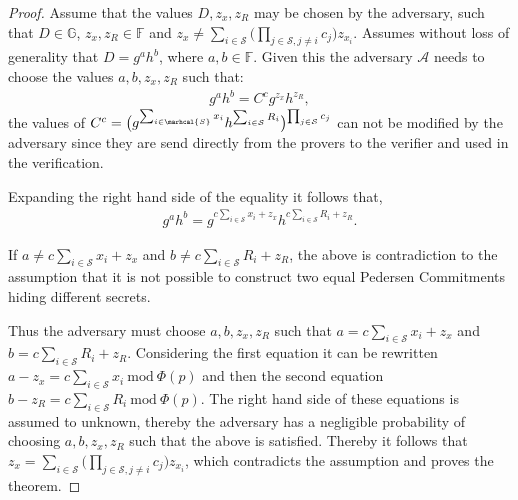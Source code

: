 \begin{proof}
Assume that the values $D,z_x,z_R$ may be chosen by the adversary, such that $D\in\mathds{G}$, $z_x,z_R\in\mathds{F}$ and  $z_x \neq \sum_{i\in\mathcal{S}} \Big( \prod_{j\in\mathcal{S}, j\neq i} c_j \big) z_{x_i}$. Assumes without loss of generality that  $D=g^ah^b$, where $a,b\in\mathds{F}$. Given this the adversary $\mathcal{A}$ needs to choose the values $a,b,z_x,z_R$ such that:
\begin{align*}
g^a h^b  = C^cg^{z_x}h^{z_R},
\end{align*}
the values of $C^c= \big(g^{\sum_{i\in\marhcal{S}}x_i}h^{\sum_{i\in\mathcal{S}} R_i} \big)^{\prod_{j\in\mathcal{S}}c_j} $ can not be modified by the adversary since they are send directly from the provers to the verifier and used in the verification.

Expanding the right hand side of the equality it follows that,
\begin{align*}
g^ah^b =  g^{c \sum_{i\in\mathcal{S}}x_i +z_x } h^{ c \sum_{i\in\mathcal{S}}R_i +z_R   }.
\end{align*}

If $a\neq c\sum_{i\in\mathcal{S}}x_i+z_x$ and $b\neq c\sum_{i\in\mathcal{S}}R_i +z_R$, the above is contradiction to the assumption that it is not possible to construct two equal Pedersen Commitments hiding different secrets. 

Thus the adversary must choose $a,b,z_x,z_R$ such that $a =  c\sum_{i\in\mathcal{S}}x_i+z_x$ and $b =  c\sum_{i\in\mathcal{S}}R_i +z_R$.  Considering the first equation it can be rewritten $a-z_x =  c \sum_{i\in\mathcal{S}} x_i \:\text{mod}\:\Phi(p)$ and then the second equation $b-z_R =  c \sum_{i\in\mathcal{S}} R_i \:\text{mod}\:\Phi(p)$. The right hand side of these equations is assumed to unknown, thereby the adversary has a negligible probability of choosing $a,b,z_x,z_R$ such that the above is satisfied. Thereby it follows that  $z_x = \sum_{i\in\mathcal{S}} \Big( \prod_{j\in\mathcal{S}, j\neq i} c_j \big) z_{x_i}$, which contradicts the assumption and proves the theorem. 





\end{proof}
